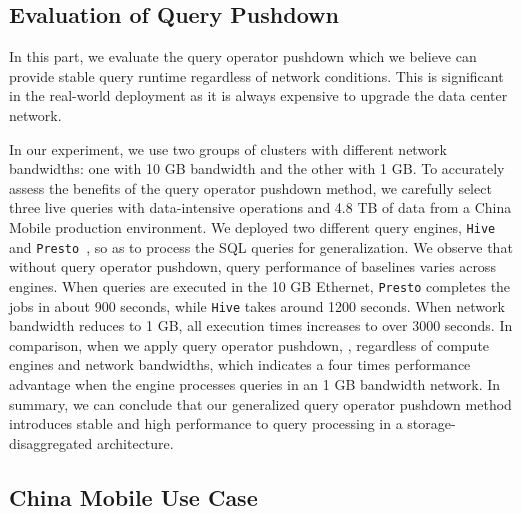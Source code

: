 \subsection{Evaluation of Query Pushdown}
In this part, we evaluate the query operator pushdown  which we believe can provide stable query runtime regardless of network conditions. This is significant in the real-world deployment as it is  always expensive to upgrade the data center network. 




In our experiment, we use two groups of clusters with different network bandwidths: one with 10 GB bandwidth and the other with 1 GB. To accurately assess the benefits of the query operator pushdown method, we carefully select three live queries with data-intensive operations and 4.8 TB of data from a China Mobile production environment. We deployed two different query engines, \texttt{Hive}~\cite{} and \texttt{Presto}~\cite{}, so as to process the SQL queries for generalization.
We observe that  without query operator pushdown, query performance of baselines varies  across engines. When  queries are executed in the 10 GB Ethernet, \texttt{Presto} completes the jobs in about 900 seconds, while \texttt{Hive} takes around 1200 seconds. When network bandwidth reduces to 1 GB, all execution times increases to over 3000 seconds.
 In comparison, when we apply query operator pushdown, , regardless of compute engines and network bandwidths, which indicates a four times performance advantage when the engine processes queries in an 1 GB bandwidth network.  In summary, we can conclude that our generalized query operator pushdown method introduces stable and high performance to query processing in a storage-disaggregated architecture. 







\subsection{China Mobile Use Case}